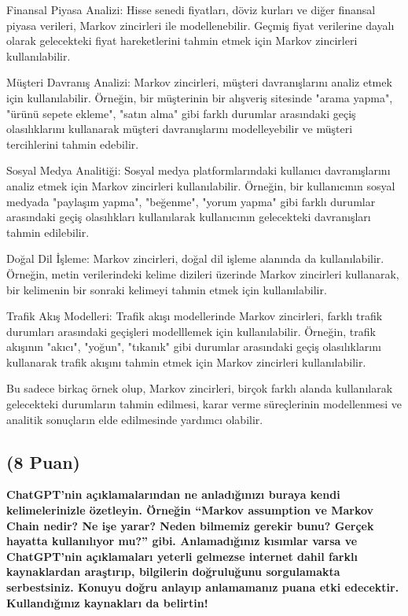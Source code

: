 \documentclass[11pt]{article}
\begin{document}
Finansal Piyasa Analizi: Hisse senedi fiyatları, döviz kurları ve diğer finansal piyasa verileri, Markov zincirleri ile modellenebilir. Geçmiş fiyat verilerine dayalı olarak gelecekteki fiyat hareketlerini tahmin etmek için Markov zincirleri kullanılabilir.

Müşteri Davranış Analizi: Markov zincirleri, müşteri davranışlarını analiz etmek için kullanılabilir. Örneğin, bir müşterinin bir alışveriş sitesinde "arama yapma", "ürünü sepete ekleme", "satın alma" gibi farklı durumlar arasındaki geçiş olasılıklarını kullanarak müşteri davranışlarını modelleyebilir ve müşteri tercihlerini tahmin edebilir.

Sosyal Medya Analitiği: Sosyal medya platformlarındaki kullanıcı davranışlarını analiz etmek için Markov zincirleri kullanılabilir. Örneğin, bir kullanıcının sosyal medyada "paylaşım yapma", "beğenme", "yorum yapma" gibi farklı durumlar arasındaki geçiş olasılıkları kullanılarak kullanıcının gelecekteki davranışları tahmin edilebilir.

Doğal Dil İşleme: Markov zincirleri, doğal dil işleme alanında da kullanılabilir. Örneğin, metin verilerindeki kelime dizileri üzerinde Markov zincirleri kullanarak, bir kelimenin bir sonraki kelimeyi tahmin etmek için kullanılabilir.

Trafik Akış Modelleri: Trafik akışı modellerinde Markov zincirleri, farklı trafik durumları arasındaki geçişleri modelllemek için kullanılabilir. Örneğin, trafik akışının "akıcı", "yoğun", "tıkanık" gibi durumlar arasındaki geçiş olasılıklarını kullanarak trafik akışını tahmin etmek için Markov zincirleri kullanılabilir.

Bu sadece birkaç örnek olup, Markov zincirleri, birçok farklı alanda kullanılarak gelecekteki durumların tahmin edilmesi, karar verme süreçlerinin modellenmesi ve analitik sonuçların elde edilmesinde yardımcı olabilir.

\subsection{(8 Puan)} \textbf{ChatGPT’nin açıklamalarından ne anladığınızı buraya kendi kelimelerinizle özetleyin. Örneğin ``Markov assumption ve Markov Chain nedir? Ne işe yarar? Neden bilmemiz gerekir bunu? Gerçek hayatta kullanılıyor mu?'' gibi. Anlamadığınız kısımlar varsa ve ChatGPT’nin açıklamaları yeterli gelmezse internet dahil farklı kaynaklardan araştırıp, bilgilerin doğruluğunu sorgulamakta serbestsiniz. Konuyu doğru anlayıp anlamamanız puana etki edecektir. Kullandığınız kaynakları da belirtin!}
\end{document}
